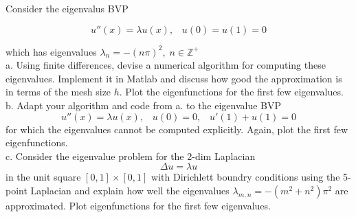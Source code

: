 Consider the eigenvalus BVP

$$u''(x)=\lambda u(x),\;\;\;u(0)=u(1)=0$$

which has eigenvalues $\lambda_n=-(n\pi)^2,\;n\in\mathbb{Z}^+$\\
a. Using finite differences, devise a numerical algorithm for computing these eigenvalues. Implement it
in Matlab and discuss how good the approximation is in terms of the mesh size $h$. Plot the
eigenfunctions for the first few eigenvalues.\\
b. Adapt your algorithm and code from a. to the eigenvalue BVP
$$u''(x)=\lambda u(x),\;\;\;u(0)=0,\;\;\;u'(1)+u(1)=0$$
for which the eigenvalues cannot be computed explicitly. Again, plot the first few eigenfunctions.\\
c. Consider the eigenvalue problem for the 2-dim Laplacian
$$\Delta u=\lambda u$$
in the unit square $[0,1]\times[0,1]$ with Dirichlett boundry conditions using the 5-point Laplacian and
explain how well the eigenvalues $\lambda_{m,n}=-(m^2+n^2)\pi^2$ are approximated. Plot eigenfunctions
for the first few eigenvalues.\\

